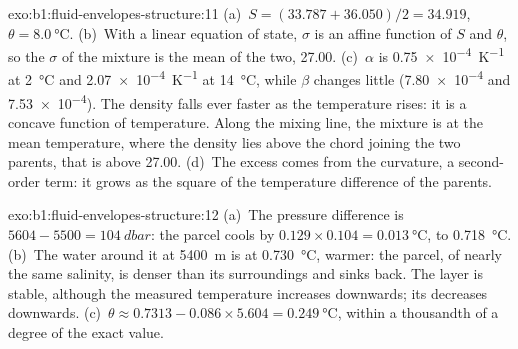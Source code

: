 \begin{solution}{exo:b1:fluid-envelopes-structure:11}
(a)~$S = (33.787 + 36.050)/2 = 34.919$, $\theta = \qty{8.0}{\celsius}$.
(b)~With a linear equation of state, $\sigma$ is an affine function of $S$ and
$\theta$, so the $\sigma$ of the mixture is the mean of the two, 27.00.
(c)~$\alpha$ is \qty{0.75e-4}{K^{-1}} at \qty{2}{\celsius} and
\qty{2.07e-4}{K^{-1}} at \qty{14}{\celsius}, while $\beta$ changes little
(\num{7.80e-4} and \num{7.53e-4}). The density falls ever faster as the
temperature rises: it is a concave function of temperature. Along the mixing
line, the mixture is at the mean temperature, where the density lies above the
chord joining the two parents, that is above 27.00. (d)~The excess comes from the
curvature, a second-order term: it grows as the square of the temperature
difference of the parents.
\end{solution}

\begin{solution}{exo:b1:fluid-envelopes-structure:12}
(a)~The pressure difference is $5604 - 5500 = \qty{104}{dbar}$: the parcel cools
by $0.129 \times 0.104 = \qty{0.013}{\celsius}$, to \qty{0.718}{\celsius}.
(b)~The water around it at \qty{5400}{m} is at \qty{0.730}{\celsius}, warmer: the
parcel, of nearly the same salinity, is denser than its surroundings and sinks
back. The layer is stable, although the measured temperature increases
downwards; its  decreases downwards. (c)~$\theta \approx
0.7313 - 0.086 \times 5.604 = \qty{0.249}{\celsius}$, within a thousandth of a
degree of the exact value.
\end{solution}

